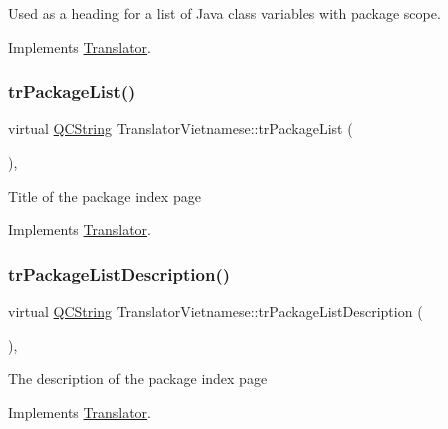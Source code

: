 Used as a heading for a list of Java class variables with package scope. 

Implements \mbox{\hyperlink{class_translator}{Translator}}.

\mbox{\label{class_translator_vietnamese_af860155589c4ff8f49d3efb3500adc76}} 
\subsubsection{\texorpdfstring{trPackageList()}{trPackageList()}}
{\footnotesize\ttfamily virtual \mbox{\hyperlink{class_q_c_string}{Q\+C\+String}} Translator\+Vietnamese\+::tr\+Package\+List (\begin{DoxyParamCaption}{ }\end{DoxyParamCaption})\hspace{0.3cm}{\ttfamily [inline]}, {\ttfamily [virtual]}}

Title of the package index page 

Implements \mbox{\hyperlink{class_translator}{Translator}}.

\mbox{\label{class_translator_vietnamese_a437dbe9a75011fe49e0c3f980ac104ed}} 
\subsubsection{\texorpdfstring{trPackageListDescription()}{trPackageListDescription()}}
{\footnotesize\ttfamily virtual \mbox{\hyperlink{class_q_c_string}{Q\+C\+String}} Translator\+Vietnamese\+::tr\+Package\+List\+Description (\begin{DoxyParamCaption}{ }\end{DoxyParamCaption})\hspace{0.3cm}{\ttfamily [inline]}, {\ttfamily [virtual]}}

The description of the package index page 

Implements \mbox{\hyperlink{class_translator}{Translator}}.

\mbox{\label{class_translator_vietnamese_afafa8df38661a460d19ae97509725ca0}} 
